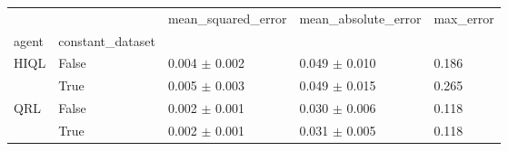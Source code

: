 \begin{tabular}{lllll}
\toprule
 &  & mean_squared_error & mean_absolute_error & max_error \\
agent & constant_dataset &  &  &  \\
\midrule
\multirow[t]{2}{*}{HIQL} & False & 0.004 $\pm$ 0.002 & 0.049 $\pm$ 0.010 & 0.186 \\
 & True & 0.005 $\pm$ 0.003 & 0.049 $\pm$ 0.015 & 0.265 \\
\cline{1-5}
\multirow[t]{2}{*}{QRL} & False & 0.002 $\pm$ 0.001 & 0.030 $\pm$ 0.006 & 0.118 \\
 & True & 0.002 $\pm$ 0.001 & 0.031 $\pm$ 0.005 & 0.118 \\
\cline{1-5}
\bottomrule
\end{tabular}
